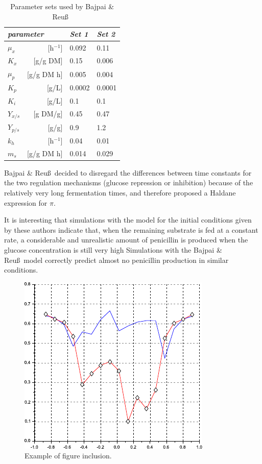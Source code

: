 \documentclass[ss]{imsart}
\numberwithin{equation}{section}
\theoremstyle{plain}
\begin{document}
\begin{table}
\centering
\caption{Parameter sets used by Bajpai \& Reu\ss\ }\label{parset}
\begin{tabular}{lrll}
\hline
\multicolumn{2}{l}{\it parameter} & {\it Set 1} & {\it Set 2}\\
\hline
$\mu_{x}$           & [h$^{-1}$]  & 0.092       & 0.11          \\
$K_{x}$             & [g/g DM]     & 0.15        & 0.006         \\
$\mu_{p}$           & [g/g DM h]  & 0.005       & 0.004         \\
$K_{p}$             & [g/L]        & 0.0002      & 0.0001        \\
$K_{i}$             & [g/L]        & 0.1         & 0.1           \\
$Y_{x/s}$           & [g DM/g]     & 0.45        & 0.47          \\
$Y_{p/s}$           & [g/g]        & 0.9         & 1.2           \\
$k_{h}$             & [h$^{-1}$]  & 0.04        & 0.01          \\
$m_{s}$             & [g/g DM h]  & 0.014       & 0.029         \\
\hline
\end{tabular}
\end{table}

Bajpai \& Reu\ss\ decided to disregard the
differences between time constants for the two regulation mechanisms
(glucose repression or inhibition) because of the
relatively very long fermentation times, and therefore proposed a Haldane
expression for $\pi$.

It is interesting that simulations with the \cite{r4} model for the
initial conditions given by these authors indicate that, when the
remaining substrate is fed at a constant rate, a considerable and
unrealistic amount of penicillin is
produced when the glucose concentration is still very high \cite{r2,r3,r4}
Simulations with the Bajpai \& Reu\ss\ model correctly predict almost
no penicillin production in similar conditions.

\begin{figure}
\includegraphics{figure1}
\caption{Example of figure inclusion.}
\label{penG}
\end{figure}
\end{document}
